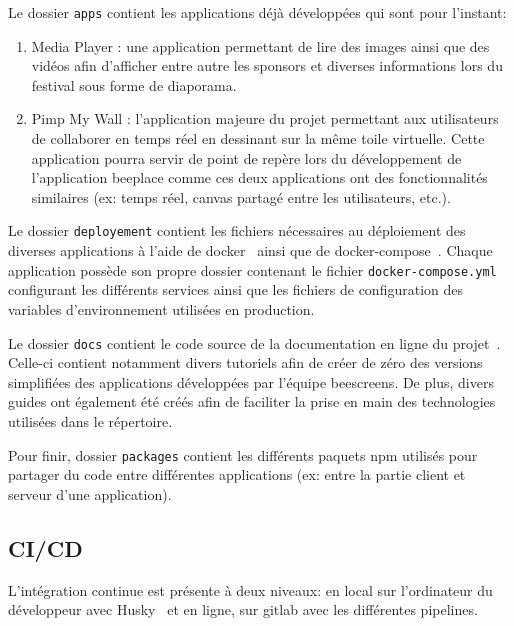 Le dossier \texttt{apps} contient les applications déjà développées qui sont pour l'instant:

\begin{enumerate}
  \item Media Player : une application permettant de lire des images ainsi que des vidéos afin d'afficher entre autre les sponsors et diverses informations lors du festival sous forme de diaporama.
  \item Pimp My Wall : l'application majeure du projet permettant aux utilisateurs de collaborer en temps réel en dessinant sur la même toile virtuelle. Cette application pourra servir de point de repère lors du développement de l'application \gls{beeplace} comme ces deux applications ont des fonctionnalités similaires (ex: temps réel, canvas partagé entre les utilisateurs, etc.).
\end{enumerate}

Le dossier \texttt{deployement} contient les fichiers nécessaires au déploiement des diverses applications à l'aide de \gls{docker}~\cite{docker} ainsi que de \gls{docker-compose}~\cite{docker-compose}. Chaque application possède son propre dossier contenant le fichier  \texttt{docker-compose.yml} configurant les différents services ainsi que les fichiers de configuration des variables d'environnement utilisées en production.

Le dossier \texttt{docs} contient le code source de la documentation en ligne du projet~\cite{beescreensdocs}. Celle-ci contient notamment divers tutoriels afin de créer de zéro des versions simplifiées des applications développées par l'équipe \gls{beescreens}. De plus, divers guides ont également été créés afin de faciliter la prise en main des technologies utilisées dans le répertoire.

Pour finir, dossier \texttt{packages} contient les différents paquets \gls{npm} utilisés pour partager du code entre différentes applications (ex: entre la partie client et serveur d'une application).

\subsection{CI/CD}

L'intégration continue est présente à deux niveaux: en local sur l'ordinateur du développeur avec Husky~\cite{husky} et en ligne, sur \gls{gitlab} avec les différentes pipelines.

